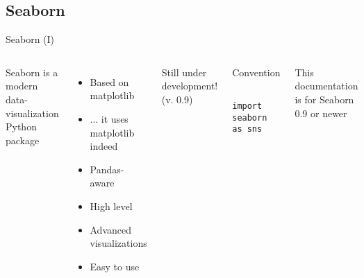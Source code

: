 \documentclass[10pt,compress]{beamer} %
\begin{document}
\subsection{Seaborn}

\begin{frame}[fragile]{Seaborn (I)}
	\begin{columns}
	Seaborn is a modern data-visualization Python package
	\begin{itemize}
		\item Based on matplotlib
		\item ... it uses matplotlib indeed
		\item Pandas-aware
		\item High level
		\item Advanced visualizations
		\item Easy to use
	\end{itemize}
	Still under development! (v. 0.9)
	\begin{block}{\footnotesize{Convention}}
	\vspace{-0.2cm} 
	\begin{lstlisting}
	import seaborn as sns
	\end{lstlisting}
	\vspace{-0.2cm} 
	\end{block}

	\begin{alertblock}{}
	\vspace{-0.2cm} 
	\footnotesize{This documentation is for Seaborn 0.9 or newer}
	\vspace{-0.2cm} 
	\end{alertblock}

	\end{columns}
\end{frame}
\end{document}

